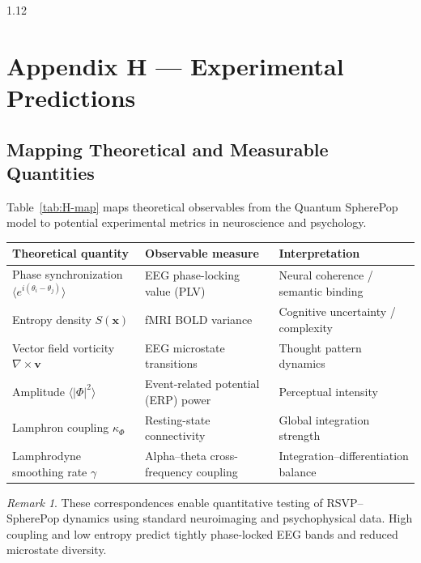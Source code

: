 \documentclass[12pt,a4paper]{article}
\numberwithin{equation}{section}
\theoremstyle{remark}
\newtheorem{remark}{Remark}[section]
\theoremstyle{definition}
\begin{document}
\begin{spacing}{1.12}
\linespread{1.05}
\setlength{\parindent}{0pt}


\section*{Appendix H — Experimental Predictions}

\subsection{Mapping Theoretical and Measurable Quantities}\label{sec:H-map}

Table~\ref{tab:H-map} maps theoretical observables from the Quantum SpherePop model to potential experimental metrics in neuroscience and psychology.

\begin{center}
\begin{tabular}{lll}
\toprule
\textbf{Theoretical quantity} & \textbf{Observable measure} & \textbf{Interpretation} \\
\midrule
Phase synchronization $\langle e^{i(\theta_i-\theta_j)}\rangle$ &
EEG phase-locking value (PLV) & Neural coherence / semantic binding \\
Entropy density $S(\mathbf{x})$ &
fMRI BOLD variance & Cognitive uncertainty / complexity \\
Vector field vorticity $\nabla\times \mathbf{v}$ &
EEG microstate transitions & Thought pattern dynamics \\
Amplitude $\langle|\Phi|^2\rangle$ &
Event-related potential (ERP) power & Perceptual intensity \\
Lamphron coupling $\kappa_\Phi$ &
Resting-state connectivity & Global integration strength \\
Lamphrodyne smoothing rate $\gamma$ &
Alpha–theta cross-frequency coupling & Integration–differentiation balance \\
\bottomrule
\end{tabular}
\label{tab:H-map}
\end{center}

\begin{remark}
These correspondences enable quantitative testing of RSVP–SpherePop dynamics using standard neuroimaging and psychophysical data.  
High coupling and low entropy predict tightly phase-locked EEG bands and reduced microstate diversity.
\end{remark}


\end{spacing}
\end{document}

